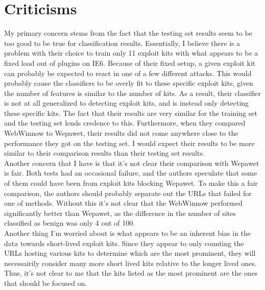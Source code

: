 \documentclass{article}
\begin{document}
\section{Criticisms}
My primary concern stems from the fact that the testing set results seem to be too good to be true for classification results.
Essentially, I believe there is a problem with their choice to train only 11 exploit kits with what appears to be a fixed load out of plugins on IE6.
Because of their fixed setup, a given exploit kit can probably be expected to react in one of a few different attacks.
This would probably cause the classifiers to be overly fit to these specific exploit kits,
given the number of features is similar to the number of kits.
As a result, their classifier is not at all generalized to detecting exploit kits,
and is instead only detecting these specific kits.
The fact that their results are very similar for the training set and the testing set lends credence to this.
Furthermore, when they compared WebWinnow to Wepawet,
their results did not come anywhere close to the performance they got on the testing set.
I would expect their results to be more similar to their comparison results than their testing set results.\\
Another concern that I have is that it's not clear their comparison with Wepawet is fair.
Both tests had an occasional failure, and the authors speculate that some of them could have been from exploit kits blocking Wepawet.
To make this a fair comparison, the authors should probably separate out the URLs that failed for one of methods.
Without this it's not clear that the WebWinnow performed significantly better than Wepawet,
as the difference in the number of sites classified as benign was only 4 out of 100.\\
Another thing I'm worried about is what appears to be an inherent bias in the data towards short-lived exploit kits.
Since they appear to only counting the URLs hosting various kits to determine which are the most prominent,
they will necessairily consider many more short lived kits relative to the longer lived ones.
Thus, it's not clear to me that the kits listed as the most prominent are the ones that should be focused on.
\end{document}
